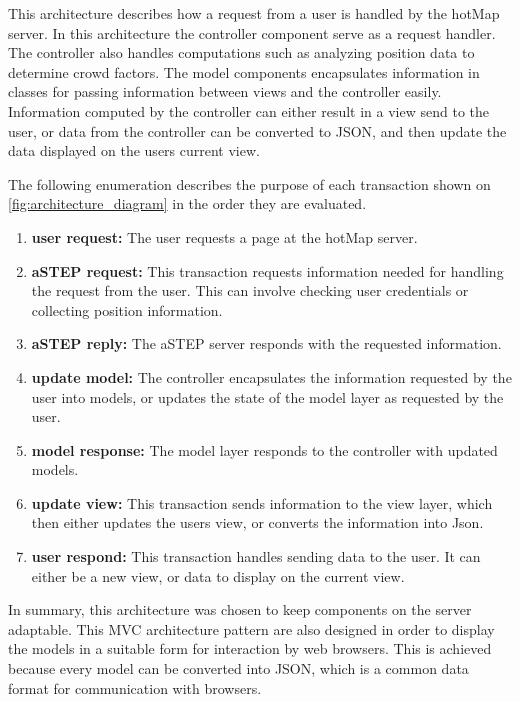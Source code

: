 
This architecture describes how a request from a user is handled by the hotMap server. In this architecture the controller component serve as a request handler. The controller also handles computations such as analyzing position data to determine crowd factors. The model components encapsulates information in classes for passing information between views and the controller easily. Information computed by the controller can either result in a view send to the user, or data from the controller can be converted to JSON, and then update the data displayed on the users current view. 


The following enumeration describes the purpose of each transaction shown on \cref{fig:architecture_diagram} in the order they are evaluated.

\begin{enumerate}
    \item \textbf{user request:} The user requests a page at the hotMap server.
    \item \textbf{aSTEP request:} This transaction requests information needed for handling the request from the user. This can involve checking user credentials or collecting position information.
    \item \textbf{aSTEP reply:} The aSTEP server responds with the requested information.
    \item \textbf{update model:} The controller encapsulates the information requested by the user into models, or updates the state of the model layer as requested by the user.
    \item \textbf{model response:} The model layer responds to the controller with updated models.
    \item \textbf{update view:} This transaction sends information to the view layer, which then either updates the users view, or converts the information into Json.
    \item \textbf{user respond:} This transaction handles sending data to the user. It can either be a new view, or data to display on the current view.
\end{enumerate}


In summary, this architecture was chosen to keep components on the server adaptable. This MVC architecture pattern are also designed in order to display the models in a suitable form for interaction by web browsers. This is achieved because every model can be converted into JSON, which is a common data format for communication with browsers.


